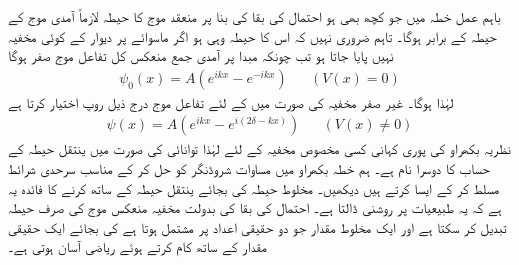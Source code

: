 باہم عمل خطہ  میں جو کچھ بھی ہو احتمال کی بقا کی بنا پر منعقد موج کا حیطہ لازماً آمدی موج کے حیطہ کے برابر ہوگا۔ تاہم ضروری نہیں کہ اس کا حیطہ وہی ہو اگر ماسوائے  پر دیوار کے کوئی مخفیہ نہیں پایا جاتا ہو تب چونکہ مبدا پر آمدی جمع منعکس کل تفاعل موج صفر ہوگا 
\begin{align}
	\psi_0(x) = A\left(e^{ikx}-e^{-ikx}\right)&&(V(x)=0)
\end{align}
لہٰذا  ہوگا۔ غیر صفر مخفیہ کی صورت میں  کے لئے تفاعل موج درج ذیل روپ اختیار کرتا ہے
\begin{align}
	\psi(x) = A\left(e^{ikx}-e^{i(2\delta-kx)}\right)&&(V(x)\neq0)
\end{align}
نظریہ بکھراو کی پوری کہانی کسی مخصوص مخفیہ کے لئے  لہٰذا توانائی  کی صورت میں ینتقل حیطہ کے حساب کا دوسرا نام ہے۔ ہم خطہ بکھراو  میں مساوات شروڈنگر کو حل کر کے مناسب سرحدی شرائط مسلط کر کے ایسا کرتے ہیں  دیکھیں۔ مخلوط حیطہ  کی بجائے ینتقل حیطہ کے ساتھ کرنے کا فائدہ یہ ہے کہ یہ طبیعیات پر روشنی ڈالتا ہے۔ احتمال کی بقا کی بدولت مخفیہ منعکس موج کی صرف حیطہ تبدیل کر سکتا ہے اور ایک مخلوط مقدار جو دو حقیقی اعداد پر مشتمل ہوتا ہے کی بجائے ایک حقیقی مقدار کے ساتھ کام کرتے ہوئے ریاضی آسان ہوتی ہے۔

